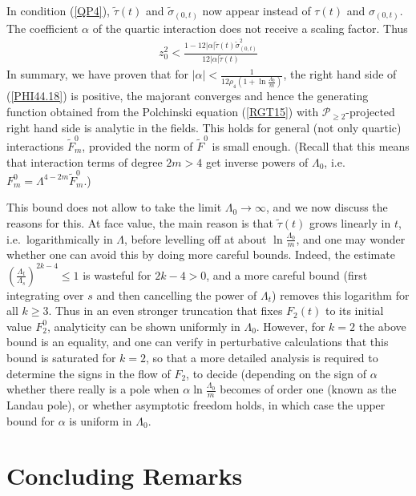 \documentclass[12pt,twoside]{amsart}
\newcommand{\cP}{{\mathcal{P}}}
\numberwithin{equation}{section}
\begin{document}
In condition (\ref{QP4}), $\tilde\tau(t)$ and $\tilde\sigma_{(0,t)}$ now appear instead of $\tau(t)$ and $\sigma_{(0,t)}$. The coefficient $\alpha$ of the quartic interaction does not receive a scaling factor. Thus
\begin{eqnarray}
z_{0}^{2} < \frac{1-12 |\alpha| \tilde\tau(t)\tilde\sigma^{2}_{(0,t)}}{12|\alpha| \tilde\tau(t)} \label{PHI44.18}
\end{eqnarray}
In summary,  we have proven that for $|\alpha|  < \frac{1}{12 \rho_4 (1+ \ln \frac{\Lambda_0}{m})}$, the right hand side of (\ref{PHI44.18}) is positive, the majorant converges and hence the generating function obtained from the Polchinski equation (\ref{RGT15}) with $\cP_{\ge 2}$-projected right hand side is analytic in the fields. This holds for general (not only quartic) interactions $\tilde F_m^0$, provided the norm of $\tilde F^0$ is small enough. (Recall that this means that interaction terms of degree $2m > 4$ get inverse powers of $\Lambda_0$, i.e.\ $F_m^0 = \Lambda^{4-2m} \tilde F_m^0$.)

This bound does not allow to take the limit $\Lambda_0 \to \infty$, and we now discuss the reasons for this. At face value, the main reason is that $\tilde\tau(t)$ grows linearly in $t$, i.e.\ logarithmically in $\Lambda$, before levelling off at about $\ln \frac{\Lambda_0}{m}$, and one may wonder whether one can avoid this by doing more careful bounds. Indeed, the estimate $(\frac{\Lambda_t}{\Lambda_s})^{2k-4} \le 1$ is wasteful for $2k-4 > 0$, and a more careful bound (first integrating over $s$ and then cancelling the power of $\Lambda_t$) removes this logarithm for all $k \ge 3$. Thus in an even stronger truncation that fixes $F_2(t)$ to its initial value $F_2^0$, analyticity can be shown uniformly in $\Lambda_0$. However, for $k=2$ the above bound is an equality, and one can verify in perturbative calculations that this bound is saturated for $k=2$, so that a more detailed analysis is required to determine the signs in the flow of $F_2$, to decide (depending on the sign of $\alpha$ whether there really is a pole when $\alpha \ln\frac{\Lambda_0}{m}$ becomes of order one (known as the Landau pole), or whether asymptotic freedom holds, in which case the upper bound for $\alpha$ is uniform in $\Lambda_0$. 

\section{Concluding Remarks}\label{conclusion}
\end{document}
